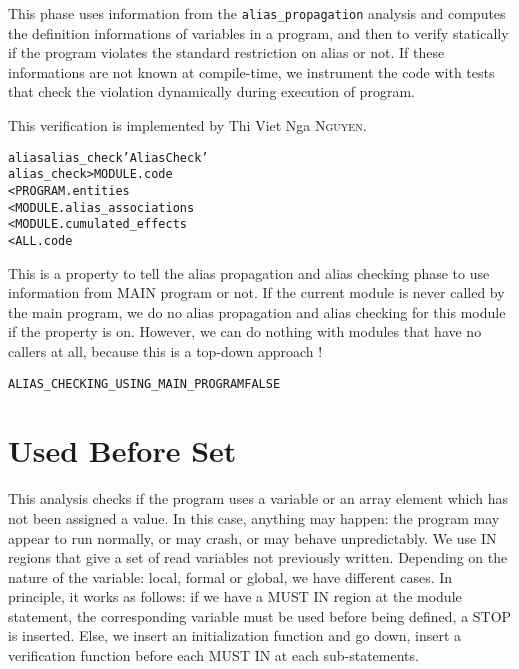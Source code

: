 \documentclass[a4paper]{report}
\newenvironment{PipsProp}{\begin{alltt}}{\end{alltt}}
\newenvironment{PipsMake}{\begin{alltt}}{\end{alltt}}
\begin{document}
This phase uses information from the \verb/alias_propagation/
analysis and computes the definition
informations of variables in a program, and then to verify
statically if the program violates the standard restriction on alias or
not. If these informations are not known at compile-time, we instrument
the code with tests that check the violation dynamically during
execution of program.

This verification is implemented by Thi Viet Nga \textsc{Nguyen}.


\begin{PipsMake}
alias alias_check 'Alias Check'
alias_check   > MODULE.code
        < PROGRAM.entities
        < MODULE.alias_associations
        < MODULE.cumulated_effects
        < ALL.code
\end{PipsMake}

This is a property to tell the alias propagation and alias checking phase to use
information from MAIN program or not. If the current module is never
called by the main program, we do no alias propagation and alias checking
for this module if the property is on. However, we can
do nothing with modules that have no callers at all, because this is a
top-down approach !

\begin{PipsProp}
ALIAS_CHECKING_USING_MAIN_PROGRAM FALSE
\end{PipsProp}

\section{Used Before Set}
\label{subsection-used-before_set}

This analysis checks if the program uses a variable or an array element
which has not been assigned a value. In this case, anything may happen:
the program may appear to run normally, or may
crash, or may behave unpredictably. We use IN regions
that give a set of read variables not previously written. Depending on the
nature of the variable: local, formal or global, we have different
cases. In principle, it
works as follows: if we have a MUST IN region at the module statement, the
corresponding variable must be used before
being defined, a STOP is inserted. Else, we insert an initialization
function and go down, insert a verification function before each MUST IN
at each sub-statements.  
\end{document}
